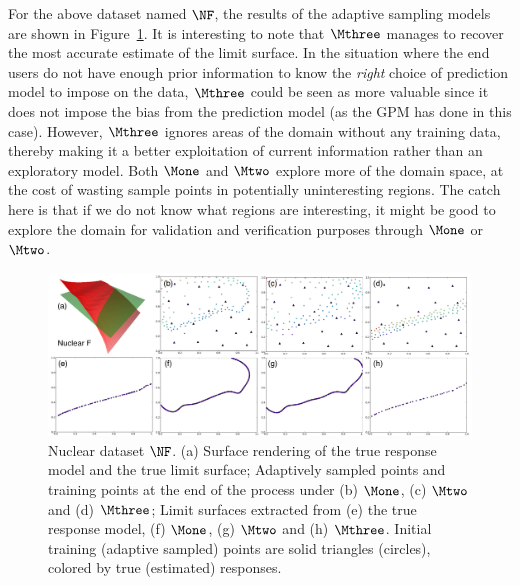 For the above dataset named $\NF$, the results of the adaptive sampling models are shown in Figure~\ref{fig:nuclear-F}.
%
It is interesting to note that $\Mthree$ manages to recover the most accurate estimate of the limit surface.
%
In the situation where the end users do not have enough prior information to know the \emph{right} choice of prediction model to impose on the data, $\Mthree$ could be seen as more valuable since it does not impose the bias from the prediction model (as the GPM has done in this case).
%
However, $\Mthree$ ignores areas of the domain without any training data, thereby making it a better exploitation of current information rather than an exploratory model.
%
Both $\Mone$ and $\Mtwo$ explore more of the domain space, at the cost of wasting sample points in potentially uninteresting regions.
%
The catch here is that if we do not know what regions are interesting, it might be good to explore the domain for validation and verification purposes through $\Mone$ or $\Mtwo$.

\begin{figure}[t]
  \centering
  \includegraphics[width=1.0\textwidth]{figs/chap5/nuclear-F.pdf}
  \caption{Nuclear dataset $\protect\NF$.
  (a) Surface rendering of the true response model and the true limit surface; Adaptively sampled points and training points at the end of the process under (b) $\protect\Mone$, (c) $\protect\Mtwo$ and (d) $\protect\Mthree$;
  Limit surfaces extracted from (e) the true response model, (f) $\protect\Mone$, (g) $\protect\Mtwo$ and (h) $\protect\Mthree$.
  Initial training (adaptive sampled) points are solid triangles (circles), colored by true (estimated) responses.}
  \label{fig:nuclear-F}
\end{figure}

